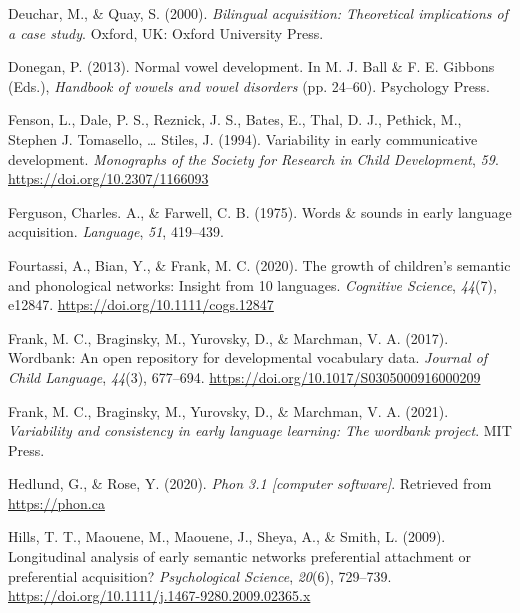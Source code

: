 \documentclass[
  man]{apa6}
\newlength{\cslhangindent}
\newlength{\cslentryspacingunit} %
\newenvironment{CSLReferences}[2] %
 {%
  \setlength{\parindent}{0pt}
  \ifodd #1
  \let\oldpar\par
  \def\par{\hangindent=\cslhangindent\oldpar}
  \fi
  \setlength{\parskip}{#2\cslentryspacingunit}
 }%
 {}
\begin{document}
\begin{CSLReferences}{1}{0}
\leavevmode{}%
Deuchar, M., \& Quay, S. (2000). \emph{Bilingual acquisition: Theoretical implications of a case study}. Oxford, {UK}: Oxford University Press.

\leavevmode{}%
Donegan, P. (2013). Normal vowel development. In M. J. Ball \& F. E. Gibbons (Eds.), \emph{Handbook of vowels and vowel disorders} (pp. 24--60). Psychology Press.

\leavevmode{}%
Fenson, L., Dale, P. S., Reznick, J. S., Bates, E., Thal, D. J., Pethick, M., Stephen J. Tomasello, \ldots{} Stiles, J. (1994). Variability in early communicative development. \emph{Monographs of the Society for Research in Child Development}, \emph{59}. \url{https://doi.org/10.2307/1166093}

\leavevmode{}%
Ferguson, Charles. A., \& Farwell, C. B. (1975). Words \& sounds in early language acquisition. \emph{Language}, \emph{51}, 419--439.

\leavevmode{}%
Fourtassi, A., Bian, Y., \& Frank, M. C. (2020). The growth of children's semantic and phonological networks: Insight from 10 languages. \emph{Cognitive Science}, \emph{44}(7), e12847. \url{https://doi.org/10.1111/cogs.12847}

\leavevmode{}%
Frank, M. C., Braginsky, M., Yurovsky, D., \& Marchman, V. A. (2017). Wordbank: An open repository for developmental vocabulary data. \emph{Journal of Child Language}, \emph{44}(3), 677--694. \url{https://doi.org/10.1017/S0305000916000209}

\leavevmode{}%
Frank, M. C., Braginsky, M., Yurovsky, D., \& Marchman, V. A. (2021). \emph{Variability and consistency in early language learning: The wordbank project}. {MIT} Press.

\leavevmode{}%
Hedlund, G., \& Rose, Y. (2020). \emph{Phon 3.1 {[}computer software{]}}. Retrieved from \url{https://phon.ca}

\leavevmode{}%
Hills, T. T., Maouene, M., Maouene, J., Sheya, A., \& Smith, L. (2009). Longitudinal analysis of early semantic networks preferential attachment or preferential acquisition? \emph{Psychological Science}, \emph{20}(6), 729--739. \url{https://doi.org/10.1111/j.1467-9280.2009.02365.x}


\end{CSLReferences}
\end{document}
